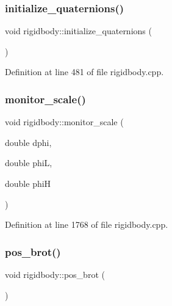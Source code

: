 \mbox{\label{classrigidbody_ae4020098663edf7350e3f7061dacb82a}} 
\subsubsection{\texorpdfstring{initialize\+\_\+quaternions()}{initialize\_quaternions()}}
{\footnotesize\ttfamily void rigidbody\+::initialize\+\_\+quaternions (\begin{DoxyParamCaption}{ }\end{DoxyParamCaption})}



Definition at line 481 of file rigidbody.\+cpp.

\mbox{\label{classrigidbody_aecb6c9283be568ba2c303d82d174d987}} 
\subsubsection{\texorpdfstring{monitor\+\_\+scale()}{monitor\_scale()}}
{\footnotesize\ttfamily void rigidbody\+::monitor\+\_\+scale (\begin{DoxyParamCaption}\item[{double}]{dphi,  }\item[{double}]{phiL,  }\item[{double}]{phiH }\end{DoxyParamCaption})}



Definition at line 1768 of file rigidbody.\+cpp.

\mbox{\label{classrigidbody_aff843c0c9e358e2d33b0c7ff02c37573}} 
\subsubsection{\texorpdfstring{pos\+\_\+brot()}{pos\_brot()}}
{\footnotesize\ttfamily void rigidbody\+::pos\+\_\+brot (\begin{DoxyParamCaption}{ }\end{DoxyParamCaption})}



